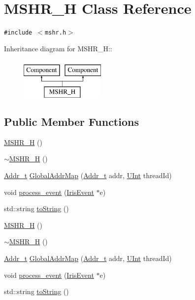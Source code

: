 \hypertarget{classMSHR__H}{
\section{MSHR\_\-H Class Reference}
\label{classMSHR__H}
}
{\tt \#include $<$mshr.h$>$}

Inheritance diagram for MSHR\_\-H::\begin{figure}[H]
\begin{center}
\leavevmode
\includegraphics[height=2cm]{classMSHR__H}
\end{center}
\end{figure}
\subsection*{Public Member Functions}
\begin{CompactItemize}
\item 
\hyperlink{classMSHR__H_ed75aac9537ffb4d5814b337c1099e82}{MSHR\_\-H} ()
\item 
\hyperlink{classMSHR__H_cbe3ee20d72b496c43ef9f6375f4da1b}{$\sim$MSHR\_\-H} ()
\item 
\hyperlink{constants_8h_51badf0ffa6471a1e529c69852e56f57}{Addr\_\-t} \hyperlink{classMSHR__H_3c9cdbe3938dcfd521f48678b335b839}{GlobalAddrMap} (\hyperlink{constants_8h_51badf0ffa6471a1e529c69852e56f57}{Addr\_\-t} addr, \hyperlink{constants_8h_ba0996d26f7be2572973245b51852757}{UInt} threadId)
\item 
void \hyperlink{classMSHR__H_1dff946e7d92eae286b8f72df7dc0f03}{process\_\-event} (\hyperlink{classIrisEvent}{IrisEvent} $\ast$e)
\item 
std::string \hyperlink{classMSHR__H_778e0a25bf58c2ccbe506a4c635f953f}{toString} ()
\item 
\hyperlink{classMSHR__H_ed75aac9537ffb4d5814b337c1099e82}{MSHR\_\-H} ()
\item 
\hyperlink{classMSHR__H_cbe3ee20d72b496c43ef9f6375f4da1b}{$\sim$MSHR\_\-H} ()
\item 
\hyperlink{constants_8h_51badf0ffa6471a1e529c69852e56f57}{Addr\_\-t} \hyperlink{classMSHR__H_3c9cdbe3938dcfd521f48678b335b839}{GlobalAddrMap} (\hyperlink{constants_8h_51badf0ffa6471a1e529c69852e56f57}{Addr\_\-t} addr, \hyperlink{constants_8h_ba0996d26f7be2572973245b51852757}{UInt} threadId)
\item 
void \hyperlink{classMSHR__H_1dff946e7d92eae286b8f72df7dc0f03}{process\_\-event} (\hyperlink{classIrisEvent}{IrisEvent} $\ast$e)
\item 
std::string \hyperlink{classMSHR__H_778e0a25bf58c2ccbe506a4c635f953f}{toString} ()
\end{CompactItemize}
